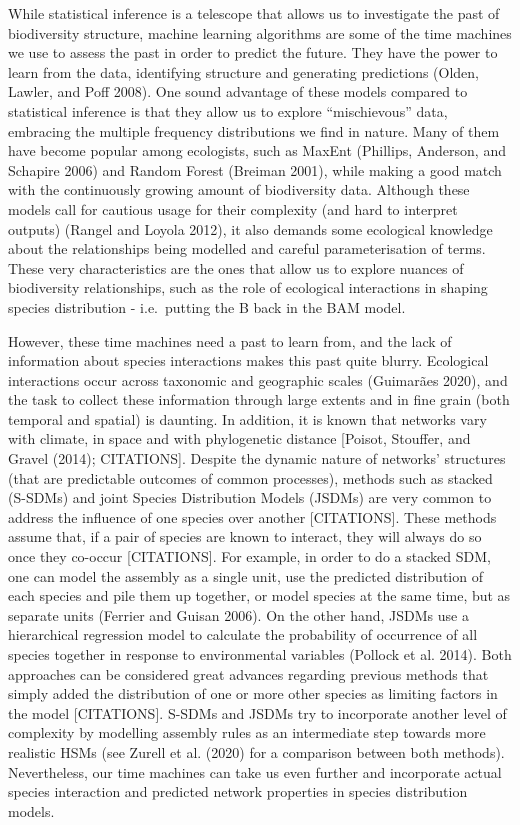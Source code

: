 \documentclass[12pt]{article}
\begin{document}
While statistical inference is a telescope that allows us to investigate
the past of biodiversity structure, machine learning algorithms are some
of the time machines we use to assess the past in order to predict the
future. They have the power to learn from the data, identifying
structure and generating predictions (Olden, Lawler, and Poff 2008). One
sound advantage of these models compared to statistical inference is
that they allow us to explore ``mischievous'' data, embracing the
multiple frequency distributions we find in nature. Many of them have
become popular among ecologists, such as MaxEnt (Phillips, Anderson, and
Schapire 2006) and Random Forest (Breiman 2001), while making a good
match with the continuously growing amount of biodiversity data.
Although these models call for cautious usage for their complexity (and
hard to interpret outputs) (Rangel and Loyola 2012), it also demands
some ecological knowledge about the relationships being modelled and
careful parameterisation of terms. These very characteristics are the
ones that allow us to explore nuances of biodiversity relationships,
such as the role of ecological interactions in shaping species
distribution - i.e.~putting the B back in the BAM model.

However, these time machines need a past to learn from, and the lack of
information about species interactions makes this past quite blurry.
Ecological interactions occur across taxonomic and geographic scales
(Guimarães 2020), and the task to collect these information through
large extents and in fine grain (both temporal and spatial) is daunting.
In addition, it is known that networks vary with climate, in space and
with phylogenetic distance {[}Poisot, Stouffer, and Gravel (2014);
CITATIONS{]}. Despite the dynamic nature of networks' structures (that
are predictable outcomes of common processes), methods such as stacked
(S-SDMs) and joint Species Distribution Models (JSDMs) are very common
to address the influence of one species over another {[}CITATIONS{]}.
These methods assume that, if a pair of species are known to interact,
they will always do so once they co-occur {[}CITATIONS{]}. For example,
in order to do a stacked SDM, one can model the assembly as a single
unit, use the predicted distribution of each species and pile them up
together, or model species at the same time, but as separate units
(Ferrier and Guisan 2006). On the other hand, JSDMs use a hierarchical
regression model to calculate the probability of occurrence of all
species together in response to environmental variables (Pollock et al.
2014). Both approaches can be considered great advances regarding
previous methods that simply added the distribution of one or more other
species as limiting factors in the model {[}CITATIONS{]}. S-SDMs and
JSDMs try to incorporate another level of complexity by modelling
assembly rules as an intermediate step towards more realistic HSMs (see
Zurell et al. (2020) for a comparison between both methods).
Nevertheless, our time machines can take us even further and incorporate
actual species interaction and predicted network properties in species
distribution models.
\end{document}
